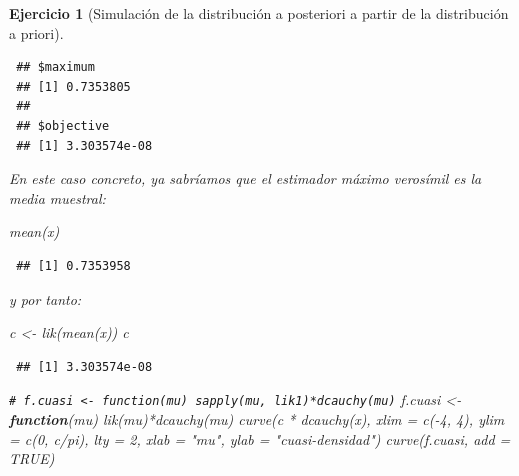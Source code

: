 \documentclass[
]{book}
\newenvironment{Shaded}{\begin{snugshade}}{\end{snugshade}}
\newcommand{\AttributeTok}[1]{\textcolor[rgb]{0.77,0.63,0.00}{#1}}
\newcommand{\CommentTok}[1]{\textcolor[rgb]{0.56,0.35,0.01}{\textit{#1}}}
\newcommand{\ConstantTok}[1]{\textcolor[rgb]{0.00,0.00,0.00}{#1}}
\newcommand{\ControlFlowTok}[1]{\textcolor[rgb]{0.13,0.29,0.53}{\textbf{#1}}}
\newcommand{\DecValTok}[1]{\textcolor[rgb]{0.00,0.00,0.81}{#1}}
\newcommand{\FunctionTok}[1]{\textcolor[rgb]{0.00,0.00,0.00}{#1}}
\newcommand{\NormalTok}[1]{#1}
\newcommand{\OtherTok}[1]{\textcolor[rgb]{0.56,0.35,0.01}{#1}}
\newcommand{\SpecialCharTok}[1]{\textcolor[rgb]{0.00,0.00,0.00}{#1}}
\newcommand{\StringTok}[1]{\textcolor[rgb]{0.31,0.60,0.02}{#1}}
\theoremstyle{break}
\newtheorem{exercise}{Ejercicio}[chapter]
\theoremstyle{nonumberplain}
\renewcommand{\CommentTok}[1]{\textcolor[rgb]{0.41,0.41,0.41}{\texttt{#1}}}
\begin{document}
\begin{exercise}[Simulación de la distribución a posteriori a partir de la distribución a priori]
\begin{enumerate}
\begin{verbatim}
 ## $maximum
 ## [1] 0.7353805
 ## 
 ## $objective
 ## [1] 3.303574e-08
\end{verbatim}

\begin{Shaded}
\end{Shaded}

  En este caso concreto, ya sabríamos que el estimador máximo verosímil es la media muestral:

\begin{Shaded}
\begin{Highlighting}[]
\FunctionTok{mean}\NormalTok{(x)}
\end{Highlighting}
\end{Shaded}

\begin{verbatim}
 ## [1] 0.7353958
\end{verbatim}

  y por tanto:

\begin{Shaded}
\begin{Highlighting}[]
\NormalTok{c }\OtherTok{\textless{}{-}} \FunctionTok{lik}\NormalTok{(}\FunctionTok{mean}\NormalTok{(x))}
\NormalTok{c   }
\end{Highlighting}
\end{Shaded}

\begin{verbatim}
 ## [1] 3.303574e-08
\end{verbatim}

\begin{Shaded}
\begin{Highlighting}[]
\CommentTok{\# f.cuasi \textless{}{-} function(mu) sapply(mu, lik1)*dcauchy(mu)}
\NormalTok{f.cuasi }\OtherTok{\textless{}{-}} \ControlFlowTok{function}\NormalTok{(mu) }\FunctionTok{lik}\NormalTok{(mu)}\SpecialCharTok{*}\FunctionTok{dcauchy}\NormalTok{(mu)    }
\FunctionTok{curve}\NormalTok{(c }\SpecialCharTok{*} \FunctionTok{dcauchy}\NormalTok{(x), }\AttributeTok{xlim =} \FunctionTok{c}\NormalTok{(}\SpecialCharTok{{-}}\DecValTok{4}\NormalTok{, }\DecValTok{4}\NormalTok{), }\AttributeTok{ylim =} \FunctionTok{c}\NormalTok{(}\DecValTok{0}\NormalTok{, c}\SpecialCharTok{/}\NormalTok{pi), }\AttributeTok{lty =} \DecValTok{2}\NormalTok{,}
      \AttributeTok{xlab =} \StringTok{"mu"}\NormalTok{, }\AttributeTok{ylab =} \StringTok{"cuasi{-}densidad"}\NormalTok{)}
\FunctionTok{curve}\NormalTok{(f.cuasi, }\AttributeTok{add =} \ConstantTok{TRUE}\NormalTok{)}
\end{Highlighting}
\end{Shaded}


\end{enumerate}
\end{exercise}
\end{document}
